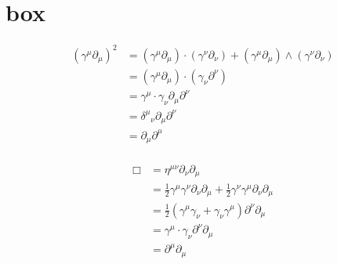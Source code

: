 
%
%




\chapter{box}
\label{chap:box}
\date{ Mmm dd, 2008.  $RCSfile: box.tex,v $ Last $Revision: 1.7 $ $Date: 2009/06/14 23:51:45 $ }

%

%


\begin{align*}
(\gamma^\mu \partial_\mu)^2 
&= 
(\gamma^\mu \partial_\mu) \cdot (\gamma^\nu \partial_\nu)
+ (\gamma^\mu \partial_\mu) \wedge (\gamma^\nu \partial_\nu) \\
&= (\gamma^\mu \partial_\mu) \cdot (\gamma_\nu \partial^\nu) \\
&= \gamma^\mu \cdot \gamma_\nu \partial_\mu \partial^\nu \\
&= {\delta^\mu}_\nu \partial_\mu \partial^\nu \\
&= \partial_\mu \partial^\mu \\
\end{align*}


\begin{align*}
\Box
&= \eta ^{\mu\nu}\partial_{\nu}  \partial_{\mu}  \\
&= \frac{1}{2}\gamma^{\mu}\gamma^{\nu} \partial_{\nu}  \partial_{\mu} +\frac{1}{2}\gamma^{\nu}\gamma^{\mu} \partial_{\nu}  \partial_{\mu} \\
&= \frac{1}{2}\left(\gamma^{\mu}\gamma_{\nu} + \gamma_{\nu}\gamma^{\mu} \right) \partial^{\nu} \partial_{\mu} \\
&= \gamma^\mu \cdot \gamma_\nu \partial^{\nu} \partial_{\mu} \\
&= \partial^{\mu} \partial_{\mu} \\
\end{align*}



